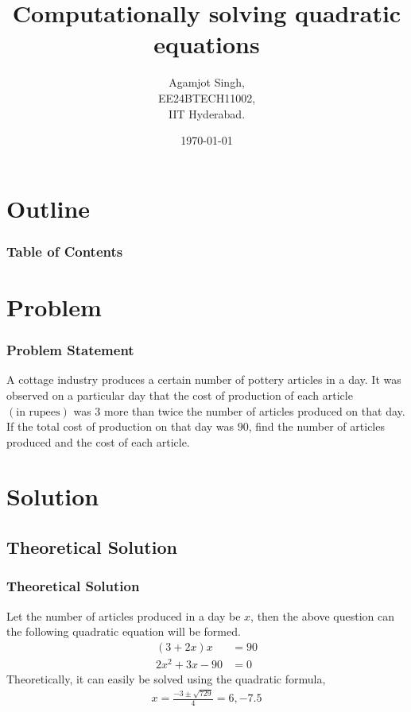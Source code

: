 \documentclass{beamer}
\title{Computationally solving quadratic equations \brak{\text{10.4.2.6}}}
\author{Agamjot Singh,\\EE24BTECH11002,\\IIT Hyderabad.}
\date{\today}
\providecommand{\brak}[1]{\ensuremath{\left(#1\right)}}
\theoremstyle{remark}
\numberwithin{equation}{section}
\begin{document}
\begin{frame}
\titlepage
\end{frame}

\section*{Outline}
\begin{frame}
\frametitle{Table of Contents}
\tableofcontents
\end{frame}

\section{Problem}

\begin{frame}
\frametitle{Problem Statement}
A cottage industry produces a certain number of pottery articles in a day. It was observed on a particular day that the cost of production of each article \brak{\text{in rupees}} was $3$ more than twice the number of articles produced on that day. If the total cost of production on that day was $90$, find the number of articles produced and the cost of each article.
\end{frame}

\section{Solution}

\subsection{Theoretical Solution}
\begin{frame}
\frametitle{Theoretical Solution}
Let the number of articles produced in a day be $x$, then the above question can the following quadratic equation will be formed.
\begin{align}
  \brak{3 + 2x}x &= 90\\
  2x^2 + 3x - 90 &= 0
\end{align}
Theoretically, it can easily be solved using the quadratic formula,
\begin{align}
  x = \frac{-3 \pm \sqrt{729}}{4} = 6, -7.5
\end{align}
\end{frame}

\end{document}
